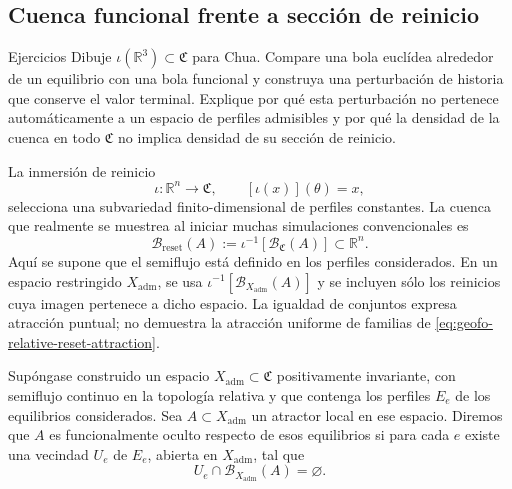 \subsection{Cuenca funcional frente a sección de reinicio}

\ifHAFOPedagogy
\begin{bloqueestudio}{Ejercicios}
Dibuje \(\iota(\mathbb R^3)\subset\mathfrak C\) para Chua. Compare una bola
euclídea alrededor de un equilibrio con una bola funcional y construya una
perturbación de historia que conserve el valor terminal. Explique por qué
esta perturbación no pertenece automáticamente a un espacio de perfiles
admisibles y por qué la densidad de la cuenca en todo \(\mathfrak C\) no
implica densidad de su sección de reinicio.
\end{bloqueestudio}
\fi
\label{subsec:geofo-two-basins}

La inmersión de reinicio
\begin{equation}
 \iota:\mathbb R^n\longrightarrow\mathfrak C,
 \qquad [\iota(x)](\theta)=x,
 \label{eq:geofo-reset-embedding}
\end{equation}
selecciona una subvariedad finito-dimensional de perfiles constantes. La
cuenca que realmente se muestrea al iniciar muchas simulaciones convencionales
es
\begin{equation}
 \mathcal B_{\mathrm{reset}}(A)
 :=\iota^{-1}\!\left[\mathcal B_{\mathfrak C}(A)\right]
 \subset\mathbb R^n.
 \label{eq:geofo-reset-basin}
\end{equation}
Aquí se supone que el semiflujo está definido en los perfiles considerados.
En un espacio restringido \(X_{\mathrm{adm}}\), se usa
\(\iota^{-1}[\mathcal B_{X_{\mathrm{adm}}}(A)]\) y se incluyen sólo los
reinicios cuya imagen pertenece a dicho espacio. La igualdad de conjuntos
expresa atracción puntual; no demuestra la atracción uniforme de familias
de \cref{eq:geofo-relative-reset-attraction}.

\begin{definition}
Supóngase construido un espacio \(X_{\mathrm{adm}}\subset\mathfrak C\)
positivamente invariante, con semiflujo continuo en la topología relativa y
que contenga los perfiles \(E_e\) de los equilibrios considerados.
Sea \(A\subset X_{\mathrm{adm}}\) un atractor local en ese espacio.
Diremos que \(A\) es funcionalmente oculto respecto de esos equilibrios si
para cada \(e\) existe una vecindad \(U_e\) de \(E_e\), abierta en
\(X_{\mathrm{adm}}\), tal que
\begin{equation}
 U_e\cap\mathcal B_{X_{\mathrm{adm}}}(A)=\varnothing.
 \label{eq:geofo-functional-hiddenness}
\end{equation}
\end{definition}

